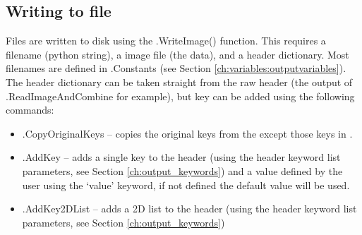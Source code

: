 \clearpage
\newpage
\subsection{Writing to file}
\label{ch:the_recipes:gen_layout:writing_to_file}

Files are written to disk using the \spirouImage.WriteImage() function. This requires a filename (python string), a image file (the data), and a header dictionary. Most filenames are defined in \spirouConfig.Constants (see Section \ref{ch:variables:outputvariables}). The header dictionary can be taken straight from the raw  header (the output of \spirouImage.ReadImageAndCombine for example), but key can be added using the following commands:

\begin{itemize}
	\item \spirouImage.CopyOriginalKeys -- copies the original keys from the  except those keys in .

	\item \spirouImage.AddKey -- adds a single key to the header (using the header keyword list parameters, see Section \ref{ch:output_keywords}) and a value defined by the user using the `value' keyword, if not defined the default value will be used.

	\item \spirouImage.AddKey2DList -- adds a 2D list to the header (using the header keyword list parameters, see Section \ref{ch:output_keywords})
\end{itemize}

